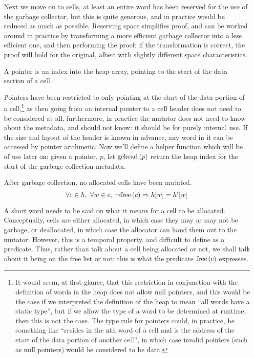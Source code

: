 Next we move on to cells, at least an entire word has been reserved
for the use of the garbage collector, but this is quite generous, and
in practice would be reduced as much as possible. Reserving space
simplifies proof, and can be worked around in practice by transforming
a more efficient garbage collector into a less efficient one, and then
performing the proof: if the transformation is correct, the proof will
hold for the original, albeit with slightly different space
characteristics.

\begin{definition}[Pointer]
  \label{def:ms-pointer}
  A pointer is an index into the heap array, pointing to the start of
  the data section of a cell.
\end{definition}

Pointers have been restricted to only pointing at the start of the
data portion of a cell,\footnote{It would seem, at first glance, that
  this restriction in conjunction with the definition of words in the
  heap does not allow null pointers, and this would be the case if we
  interpreted the definition of the heap to mean ``all words have a
  static type'', but if we allow the type of a word to be determined
  at runtime, then this is not the case. The type rule for pointers
  could, in practice, be something like ``resides in the nth word of a
  cell and is the address of the start of the data portion of another
  cell'', in which case invalid pointers (such as null pointers) would
  be considered to be data.} as then going from an internal pointer to
a cell header does not need to be considered at all, furthermore, in
practice the mutator does not need to know about the metadata, and
should not know: it should be for purely internal use. If the size and
layout of the header is known in advance, any word in it can be
accessed by pointer arithmetic. Now we'll define a helper function
which will be of use later on: given a pointer, $p$, let $\mathrm{gchead}\left(p\right)$
return the heap index for the start of the garbage collection
metadata.

\begin{definition}
  \label{def:ms-word-preservation}
  After garbage collection, no allocated cells have been mutated.
   \[\forall c \in h,\ \forall w \in c,\ \lnot\mathrm{free}\left(c\right) \Rightarrow h[w] =
   h'[w]\]
\end{definition}

A short word needs to be said on what it means for a cell to be
allocated. Conceptually, cells are either allocated, in which case
they may or may not be garbage, or deallocated, in which case the
allocator can hand them out to the mutator. However, this is a
temporal property, and difficult to define as a predicate. Thus,
rather than talk about a cell being allocated or not, we shall talk
about it being on the free list or not: this is what the predicate
$\mathrm{free}\left(c\right)$ expresses.


